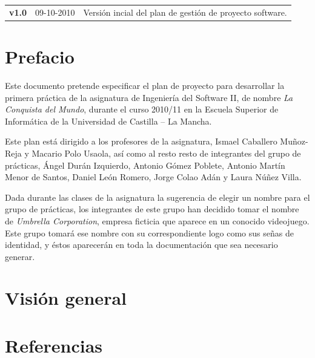 \documentclass[a4paper,11pt,oneside]{report}
\begin{document}
\begin{center}
\begin{tabularx}{\textwidth}{p{}p{}X}
\textbf{v1.0} & 09-10-2010 & Versión incial del plan de gestión de proyecto
software.
\end{tabularx}
\end{center}

\clearpage

\chapter*{Prefacio}

Este documento pretende especificar el plan de proyecto para desarrollar la
primera práctica de la asignatura de Ingeniería del Software II, de nombre
\textit{La Conquista del Mundo}, durante el curso 2010/11 en la Escuela Superior
de Informática de la Universidad de Castilla -- La Mancha.

Este plan está dirigido a los profesores de la asignatura, Ismael Caballero
Muñoz-Reja y Macario Polo Usaola, así como al resto resto de integrantes del
grupo de prácticas, Ángel Durán Izquierdo, Antonio Gómez Poblete, Antonio Martín
Menor de Santos, Daniel León Romero, Jorge Colao Adán y Laura Núñez Villa.

Dada durante las clases de la asignatura la sugerencia de elegir un nombre para
el grupo de prácticas, los integrantes de este grupo han decidido tomar el
nombre de \textit{Umbrella Corporation}, empresa ficticia que aparece en un
conocido videojuego. Este grupo tomará ese nombre con su correspondiente logo
como sus señas de identidad, y éstos aparecerán en toda la documentación que
sea necesario generar.

\clearpage

\tableofcontents
{}

\clearpage

\pagestyle{fancy}

\chapter{Visión general}


\chapter{Referencias}

\end{document}
